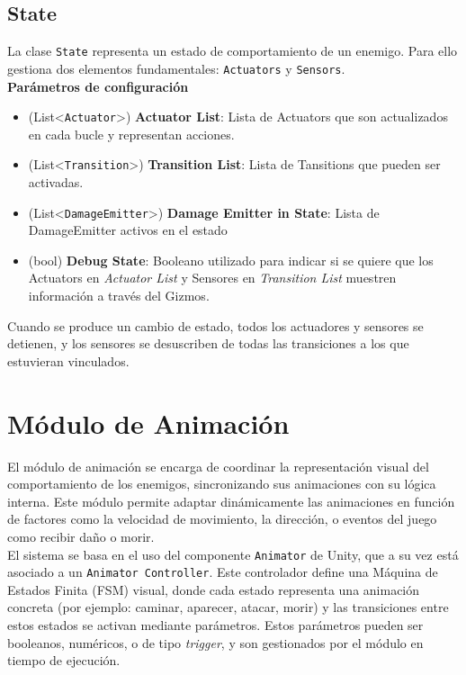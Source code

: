 \subsection{State}

La clase \texttt{State} representa un estado de comportamiento de un enemigo. Para ello gestiona dos elementos fundamentales: \texttt{Actuators} y \texttt{Sensors}.\\
\textbf{Parámetros de configuración}
\begin{itemize}
	\item (List<\texttt{Actuator}>) \textbf{Actuator List}: Lista de Actuators que son actualizados en cada bucle y representan acciones.
	\item (List<\texttt{Transition}>) \textbf{Transition List}: Lista de Tansitions que pueden ser activadas.
	\item (List<\texttt{DamageEmitter}>) \textbf{Damage Emitter in State}: Lista de DamageEmitter activos en el estado
	\item (bool) \textbf{Debug State}: Booleano utilizado para indicar si se quiere que los Actuators en \textit{Actuator List} y Sensores en \textit{Transition List} muestren información a través del Gizmos.
\end{itemize}
Cuando se produce un cambio de estado, todos los actuadores y sensores se detienen, y los sensores se desuscriben de todas las transiciones a los que estuvieran vinculados.\\

\section{Módulo de Animación} \label{sec:animation}

El módulo de animación se encarga de coordinar la representación visual del comportamiento de los enemigos, sincronizando sus animaciones con su lógica interna. Este módulo permite adaptar dinámicamente las animaciones en función de factores como la velocidad de movimiento, la dirección, o eventos del juego como recibir daño o morir.\\

El sistema se basa en el uso del componente \texttt{Animator} de Unity, que a su vez está asociado a un \texttt{Animator Controller}. Este controlador define una Máquina de Estados Finita (FSM) visual, donde cada estado representa una animación concreta (por ejemplo: caminar, aparecer, atacar, morir) y las transiciones entre estos estados se activan mediante parámetros. Estos parámetros pueden ser booleanos, numéricos, o de tipo \textit{trigger}, y son gestionados por el módulo en tiempo de ejecución.\\

